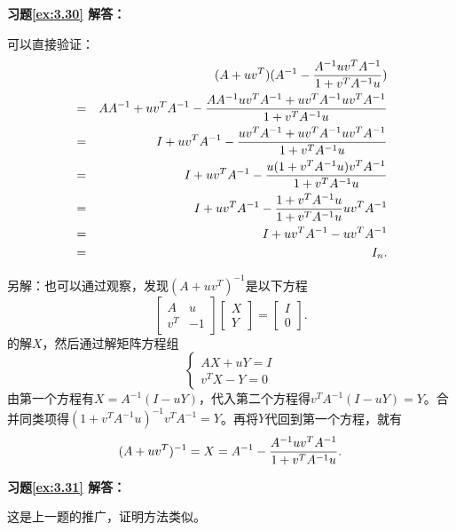 \vspace{1.5em}

\textbf{习题\ref{ex:3.30} 解答：}

可以直接验证：
\begin{eqnarray*}
& & (A+uv^T) (A^{-1} - {A^{-1}uv^T A^{-1} \over 1 + v^T A^{-1}u}) \\
& = & AA^{-1} +  uv^T A^{-1} - {AA^{-1}uv^T A^{-1} + uv^T A^{-1}uv^T A^{-1} \over 1 + v^TA^{-1}u} \\
& = & I +  uv^T A^{-1} - {uv^T A^{-1} + uv^T A^{-1}uv^T A^{-1} \over 1 + v^T A^{-1}u} \\
& = & I + uv^T A^{-1} - {u(1 + v^T A^{-1}u) v^T A^{-1} \over 1 + v^T A^{-1}u} \\
& = & I + uv^T A^{-1} - {1 + v^T A^{-1}u \over 1 + v^T A^{-1}u}uv^T A^{-1} \\
& = & I + uv^T A^{-1} - uv^T A^{-1} \\
& = & I_n.
\end{eqnarray*}

另解：也可以通过观察，发现$(A+uv^T)^{-1}$是以下方程
$$\begin{bmatrix} A & u \\ v^T & -1 \end{bmatrix}\begin{bmatrix} X \\ Y \end{bmatrix} = \begin{bmatrix} I \\ 0 \end{bmatrix}.$$
的解$X$，然后通过解矩阵方程组
$$\begin{cases}
AX + uY = I \\
v^TX - Y = 0
\end{cases}$$
由第一个方程有$X = A^{-1}(I-uY)$，代入第二个方程得$v^TA^{-1}(I-uY) = Y$。合并同类项得$(1 + v^TA^{-1}u)^{-1}v^TA^{-1} = Y$。再将$Y$代回到第一个方程，就有
$$(A+uv^T)^{-1} = X = A^{-1} - {A^{-1}uv^T A^{-1} \over 1 + v^T A^{-1}u}.$$

\vspace{1.5em}

\textbf{习题\ref{ex:3.31} 解答：}

这是上一题的推广，证明方法类似。

